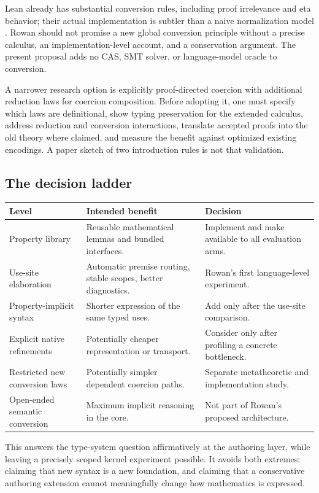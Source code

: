 \documentclass[11pt,letterpaper]{article}
\theoremstyle{definition}\newtheorem{definition}[theorem]{Definition}
\theoremstyle{remark}\newtheorem{remark}[theorem]{Remark}
\begin{document}
Lean already has substantial conversion rules, including proof irrelevance
and eta behavior; their actual implementation is subtler than a naive
normalization model \cite{lean-type}. Rowan should not promise a new global
conversion principle without a precise calculus, an implementation-level
account, and a conservation argument. The present proposal adds no CAS,
SMT solver, or language-model oracle to conversion.

A narrower research option is explicitly proof-directed coercion with
additional reduction laws for coercion composition. Before adopting it, one
must specify which laws are definitional, show typing preservation for the
extended calculus, address reduction and conversion interactions, translate
accepted proofs into the old theory where claimed, and measure the benefit
against optimized existing encodings. A paper sketch of two introduction
rules is not that validation.

\subsection{The decision ladder}
\begin{center}\small
\begin{tabularx}{\textwidth}{@{}P{.25\textwidth}Y Y@{}}
\toprule Level & Intended benefit & Decision\\\midrule
Property library & Reusable mathematical lemmas and bundled interfaces. & Implement and make available to all evaluation arms.\\
Use-site elaboration & Automatic premise routing, stable scopes, better diagnostics. & Rowan's first language-level experiment.\\
Property-implicit syntax & Shorter expression of the same typed uses. & Add only after the use-site comparison.\\
Explicit native refinements & Potentially cheaper representation or transport. & Consider only after profiling a concrete bottleneck.\\
Restricted new conversion laws & Potentially simpler dependent coercion paths. & Separate metatheoretic and implementation study.\\
Open-ended semantic conversion & Maximum implicit reasoning in the core. & Not part of Rowan's proposed architecture.\\
\bottomrule
\end{tabularx}
\end{center}

This answers the type-system question affirmatively at the authoring layer,
while leaving a precisely scoped kernel experiment possible. It avoids both
extremes: claiming that new syntax is a new foundation, and claiming that a
conservative authoring extension cannot meaningfully change how mathematics
is expressed.
\end{document}
